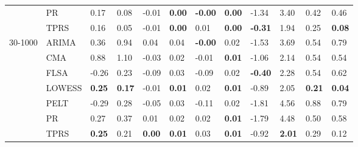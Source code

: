 \begin{table}[ht]
\begin{tabular}{llllllllllll}
   & PR & 0.17 & 0.08 & -0.01 & \textbf{0.00} & \textbf{-0.00} & \textbf{0.00} & -1.34 & 3.40 & 0.42 & 0.46 \\ 
   & TPRS & 0.16 & 0.05 & -0.01 & \textbf{0.00} & 0.01 & \textbf{0.00} & \textbf{-0.31} & 1.94 & 0.25 & \textbf{0.08} \\ 
  30-1000 & ARIMA & 0.36 & 0.94 & 0.04 & 0.04 & \textbf{-0.00} & 0.02 & -1.53 & 3.69 & 0.54 & 0.79 \\ 
   & CMA & 0.88 & 1.10 & -0.03 & 0.02 & -0.01 & \textbf{0.01} & -1.06 & 2.14 & 0.54 & 0.54 \\ 
   & FLSA & -0.26 & 0.23 & -0.09 & 0.03 & -0.09 & 0.02 & \textbf{-0.40} & 2.28 & 0.54 & 0.62 \\ 
   & LOWESS & \textbf{0.25} & \textbf{0.17} & -0.01 & \textbf{0.01} & 0.02 & \textbf{0.01} & -0.89 & 2.05 & \textbf{0.21} & \textbf{0.04} \\ 
   & PELT & -0.29 & 0.28 & -0.05 & 0.03 & -0.11 & 0.02 & -1.81 & 4.56 & 0.88 & 0.79 \\ 
   & PR & 0.27 & 0.37 & 0.01 & 0.02 & 0.02 & \textbf{0.01} & -1.79 & 4.48 & 0.50 & 0.58 \\ 
   & TPRS & \textbf{0.25} & 0.21 & \textbf{0.00} & \textbf{0.01} & 0.03 & \textbf{0.01} & -0.92 & \textbf{2.01} & 0.29 & 0.12 \\ 
   \bottomrule
\end{tabular}
\end{table}

